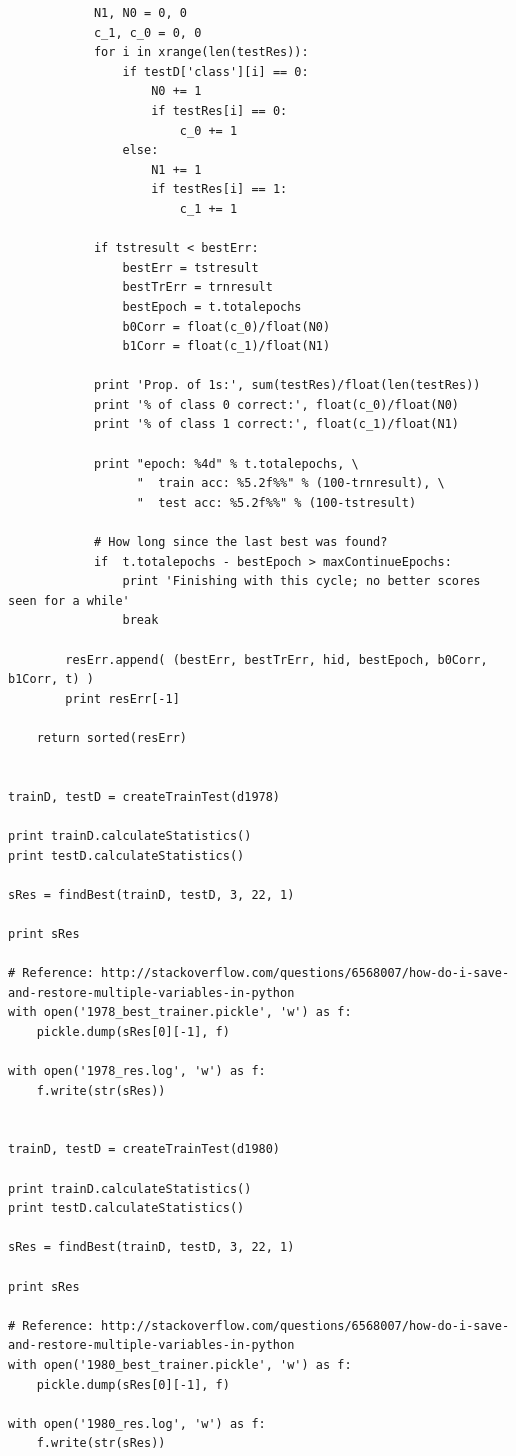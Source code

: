 \documentclass[a4paper]{article}
\theoremstyle{plain}
\begin{document}
\begin{verbatim}
            N1, N0 = 0, 0
            c_1, c_0 = 0, 0
            for i in xrange(len(testRes)):
                if testD['class'][i] == 0:
                    N0 += 1
                    if testRes[i] == 0:
                        c_0 += 1
                else:
                    N1 += 1
                    if testRes[i] == 1:
                        c_1 += 1

            if tstresult < bestErr:
                bestErr = tstresult
                bestTrErr = trnresult
                bestEpoch = t.totalepochs  
                b0Corr = float(c_0)/float(N0)
                b1Corr = float(c_1)/float(N1)

            print 'Prop. of 1s:', sum(testRes)/float(len(testRes))
            print '% of class 0 correct:', float(c_0)/float(N0)
            print '% of class 1 correct:', float(c_1)/float(N1)

            print "epoch: %4d" % t.totalepochs, \
                  "  train acc: %5.2f%%" % (100-trnresult), \
                  "  test acc: %5.2f%%" % (100-tstresult)

            # How long since the last best was found?
            if  t.totalepochs - bestEpoch > maxContinueEpochs:
                print 'Finishing with this cycle; no better scores seen for a while' 
                break

        resErr.append( (bestErr, bestTrErr, hid, bestEpoch, b0Corr, b1Corr, t) )
        print resErr[-1]
    
    return sorted(resErr)


trainD, testD = createTrainTest(d1978)

print trainD.calculateStatistics()
print testD.calculateStatistics()

sRes = findBest(trainD, testD, 3, 22, 1)

print sRes

# Reference: http://stackoverflow.com/questions/6568007/how-do-i-save-and-restore-multiple-variables-in-python
with open('1978_best_trainer.pickle', 'w') as f:
    pickle.dump(sRes[0][-1], f)

with open('1978_res.log', 'w') as f:
    f.write(str(sRes))    
    
    
trainD, testD = createTrainTest(d1980)

print trainD.calculateStatistics()
print testD.calculateStatistics()

sRes = findBest(trainD, testD, 3, 22, 1)

print sRes

# Reference: http://stackoverflow.com/questions/6568007/how-do-i-save-and-restore-multiple-variables-in-python
with open('1980_best_trainer.pickle', 'w') as f:
    pickle.dump(sRes[0][-1], f)

with open('1980_res.log', 'w') as f:
    f.write(str(sRes))

\end{verbatim}
\end{document}
